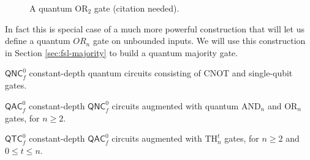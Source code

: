 \begin{figure}
\caption{A quantum $\text{OR}_2$ gate (citation needed).}
\label{fig:or2}
\end{figure}

In fact this is special case of a much more powerful construction
that will let us define a quantum $OR_n$ gate on unbounded inputs.
We will use this construction in Section \ref{sec:fsl-majority}
to build a quantum majority gate.

\begin{definition}
\item[$\textsf{QNC}^0_f$]
constant-depth quantum circuits consisting of CNOT and single-qubit gates.
\item[$\textsf{QAC}^0_f$]
constant-depth $\textsf{QNC}^0_f$ circuits augmented with quantum $\text{AND}_n$ and $\text{OR}_n$ gates,
for $n \ge 2$.
\item[$\textsf{QTC}^0_f$]
constant-depth $\textsf{QAC}^0_f$ circuits augmented with $\text{TH}_n^t$ gates, for $n \ge 2$ and
$0 \le t \le n$.
\end{definition}

\subsection{}